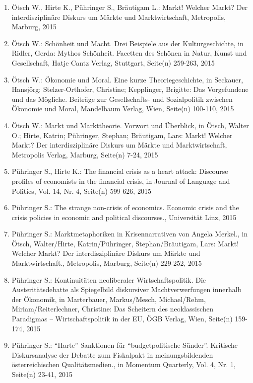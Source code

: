 \begin{enumerate}
    	 \item Ötsch W., Hirte K., Pühringer S., Bräutigam L.: Markt! Welcher Markt? Der interdisziplinäre Diskurs um Märkte und Marktwirtschaft, Metropolis, Marburg, 2015
	 \item Ötsch W.: Schönheit und Macht. Drei Beispiele aus der Kulturgeschichte, in Ridler, Gerda: Mythos Schönheit. Facetten des Schönen in Natur, Kunst und Gesellschaft, Hatje Cantz Verlag, Stuttgart, Seite(n) 259-263, 2015
	 \item Ötsch W.: Ökonomie und Moral. Eine kurze Theoriegeschichte, in Seckauer, Hansjörg; Stelzer-Orthofer, Christine; Kepplinger, Brigitte: Das Vorgefundene und das Mögliche. Beiträge zur Gesellschafts- und Sozialpolitik zwischen Ökonomie und Moral, Mandelbaum Verlag, Wien, Seite(n) 100-110, 2015
	 \item Ötsch W.: Markt und Markttheorie. Vorwort und Überblick, in Ötsch, Walter O.; Hirte, Katrin; Pühringer, Stephan; Bräutigam, Lars: Markt! Welcher Markt? Der interdisziplinäre Diskurs um Märkte und Marktwirtschaft, Metropolis Verlag, Marburg, Seite(n) 7-24, 2015
	 \item Pühringer S., Hirte K.: The financial crisis as a heart attack: Discourse profiles of economists in the financial crisis, in Journal of Language and Politics, Vol. 14, Nr. 4, Seite(n) 599-626, 2015
	 \item Pühringer S.: The strange non-crisis of economics. Economic crisis and the crisis policies in economic and political discourses., Universität Linz, 2015
	 \item Pühringer S.: Marktmetaphoriken in Krisennarrativen von Angela Merkel., in Ötsch, Walter/Hirte, Katrin/Pühringer, Stephan/Bräutigam, Lars: Markt! Welcher Markt? Der interdisziplinäre Diskurs um Märkte und Marktwirtschaft., Metropolis, Marburg, Seite(n) 229-252, 2015
	 \item Pühringer S.: Kontinuitäten neoliberaler Wirtschaftspolitik. Die Austeritätsdebatte als Spiegelbild diskursiver Machtverwerfungen innerhalb der Ökonomik, in Marterbauer, Markus/Mesch, Michael/Rehm, Miriam/Reiterlechner, Christine: Das Scheitern des neoklassischen Paradigmas – Wirtschaftspolitik in der EU, ÖGB Verlag, Wien, Seite(n) 159-174, 2015
	 \item Pühringer S.: “Harte” Sanktionen für “budgetpolitische Sünder”. Kritische Diskursanalyse der Debatte zum Fiskalpakt in meinungsbildenden österreichischen Qualitätsmedien., in Momentum Quarterly, Vol. 4, Nr. 1, Seite(n) 23-41, 2015

\end{enumerate}
